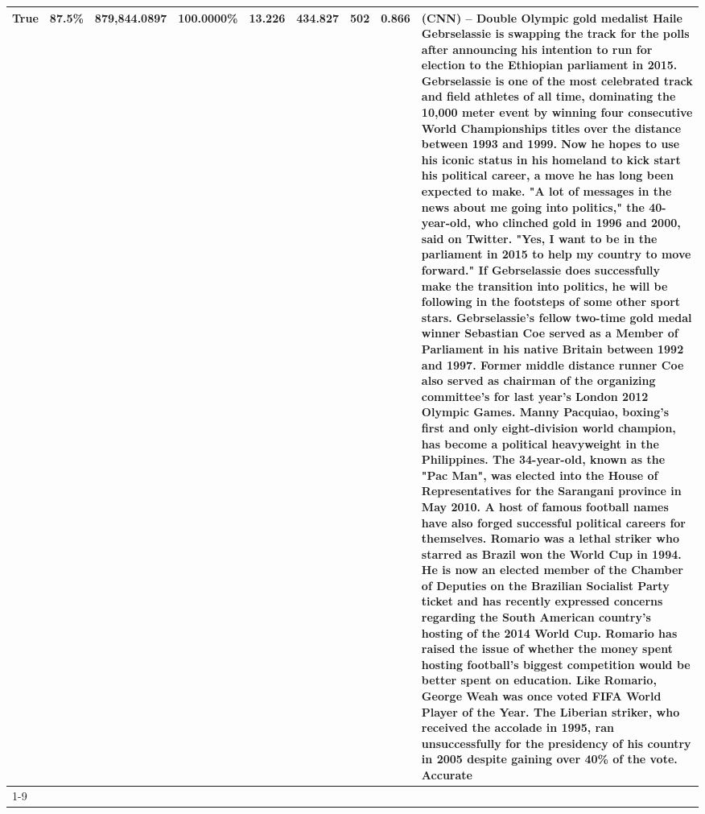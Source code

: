 \begin{table}[H]
{\begin{tabular}{lllrlllll}
True & 87.5\% & 879,844.0897 & \bfseries \color{red} 100.0000\% & 13.226 & \bfseries \color{red} 434.827 & 502 & \bfseries \color{red} 0.866 & (CNN) -- Double Olympic gold medalist Haile Gebrselassie is swapping the track for the polls after announcing his intention to run for election to the Ethiopian parliament in 2015. Gebrselassie is one of the most celebrated track and field athletes of all time, dominating the 10,000 meter event by winning four consecutive World Championships titles over the distance between 1993 and 1999. Now he hopes to use his iconic status in his homeland to kick start his political career, a move he has long been expected to make. "A lot of messages in the news about me going into politics," the 40-year-old, who clinched gold in 1996 and 2000, said on Twitter. "Yes, I want to be in the parliament in 2015 to help my country to move forward." If Gebrselassie does successfully make the transition into politics, he will be following in the footsteps of some other sport stars. Gebrselassie's fellow two-time gold medal winner Sebastian Coe served as a Member of Parliament in his native Britain between 1992 and 1997. Former middle distance runner Coe also served as chairman of the organizing committee's for last year's London 2012 Olympic Games. Manny Pacquiao, boxing's first and only eight-division world champion, has become a political heavyweight in the Philippines. The 34-year-old, known as the "Pac Man", was elected into the House of Representatives for the Sarangani province in May 2010. A host of famous football names have also forged successful political careers for themselves. Romario was a lethal striker who starred as Brazil won the World Cup in 1994. He is now an elected member of the Chamber of Deputies on the Brazilian Socialist Party ticket and has recently expressed concerns regarding the South American country's hosting of the 2014 World Cup. Romario has raised the issue of whether the money spent hosting football's biggest competition would be better spent on education. Like Romario, George Weah was once voted FIFA World Player of the Year. The Liberian striker, who received the accolade in 1995, ran unsuccessfully for the presidency of his country in 2005 despite gaining over 40\% of the vote. Accurate \\
\cline{1-9}

\end{tabular}}
\end{table}

